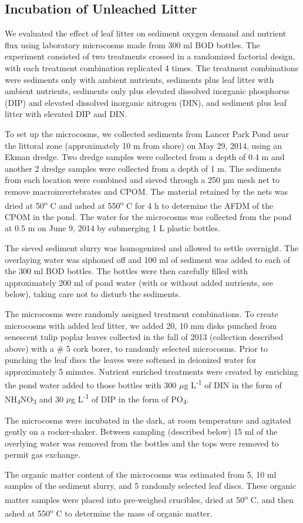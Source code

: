\subsection{Incubation of Unleached Litter}
We evaluated the effect of leaf litter on sediment oxygen demand and nutrient flux using laboratory microcosms made from 300 ml BOD bottles. The experiment consisted of two treatments crossed in a randomized factorial design, with each treatment combination replicated 4 times. The treatment combinations were sediments only with ambient nutrients, sediments plus leaf litter with ambient nutrients, sediments only plus elevated dissolved inorganic phosphorus (DIP) and elevated dissolved inorganic nitrogen (DIN), and sediment plus leaf litter with elevated DIP and DIN. 

To set up the microcosms, we collected sediments from Lancer Park Pond near the littoral zone (approximately 10 m from shore) on May 29, 2014, using an Ekman dredge.  Two dredge samples were collected from a depth of 0.4 m and another 2 dredge samples were collected from a depth of 1 m. The sediments from each location were combined and sieved through a 250 µm mesh net to remove macroinvertebrates and CPOM. The material retained by the nets was dried at 50\textsuperscript{o} C and ashed at 550\textsuperscript{o} C for 4 h to determine the AFDM of the CPOM in the pond. The water for the microcosms was  collected from the pond at 0.5 m on June 9, 2014 by submerging 1 L plastic bottles.

The sieved sediment slurry was homogenized and allowed to settle overnight. The overlaying water was siphoned off and 100 ml of sediment was added to each of the 300 ml BOD bottles. The bottles were then carefully filled with approximately 200 ml of pond water (with or without added nutrients, see below), taking care not to disturb the sediments. 

The microcosms were randomly assigned treatment combinations. To create microcosms with added leaf litter, we added 20, 10 mm disks punched from senescent tulip poplar leaves collected in the fall of 2013 (collection described above) with a \# 5 cork borer, to randomly selected microcosms. Prior to punching the leaf discs the leaves were softened in deionized water for approximately 5 minutes. Nutrient enriched treatments were created by enriching the pond water added to those bottles with 300 $\mu$g L\textsuperscript{-1} of DIN in the form of NH\textsubscript{4}NO\textsubscript{3} and 30 $\mu$g L\textsuperscript{-1} of DIP in the form of PO\textsubscript{4}.

The microcosms were incubated in the dark, at room temperature and agitated gently on a rocker-shaker. Between sampling (described below) 15 ml of the overlying water was removed from the bottles and the tops were removed to permit gas exchange.

The organic matter content of the microcosms was estimated from 5, 10 ml samples of the sediment slurry, and 5 randomly selected leaf discs. These organic matter samples were placed into pre-weighed crucibles, dried at 50\textsuperscript{o} C, and then ashed at 550\textsuperscript{o} C to determine the mass of organic matter.



    
    
